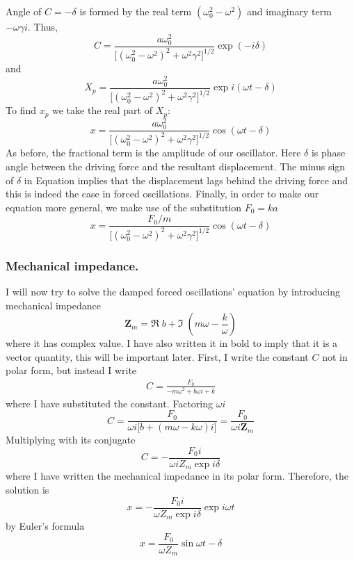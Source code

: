 \documentclass[../../../main.tex]{subfiles}
\begin{document}
Angle of $C=-\delta$ is formed by the real term $(\omega_0^2-\omega^2)$ and imaginary term $-\omega\gamma i$. Thus,
\begin{equation*}
    C=\frac{a\omega_0^2 }{\big[(\omega_0^2- \omega^2)^2 +\omega^2\gamma^2\big]^{1/2} }\exp (-i\delta )
\end{equation*}
and 
\begin{equation*}
    X_p=\frac{a\omega_0^2 }{\big[(\omega_0^2- \omega^2)^2 +\omega^2\gamma^2\big]^{1/2} }\exp i(\omega t-\delta )
\end{equation*}
To find $x_p$ we take the real part of $X_p$:
\begin{equation*}
    x=\frac{a\omega_0^2 }{\big[(\omega_0^2- \omega^2)^2 +\omega^2\gamma^2\big]^{1/2} }\cos (\omega t-\delta )
\end{equation*}
As before, the fractional term is the amplitude of our oscillator. Here $\delta $ is phase angle between the driving force and the resultant displacement. The minus sign of $\delta $ in Equation implies that the displacement lags behind the driving force and this is indeed the case in forced oscillations. Finally, in order to make our equation more general, we make use of the substitution $F_0 = ka$
\begin{equation*}
    x=\frac{F_0/m }{\big[(\omega_0^2- \omega^2)^2 +\omega^2\gamma^2\big]^{1/2} }\cos (\omega t-\delta )
\end{equation*}
\subsubsection{Mechanical impedance.} I will now try to solve the damped forced oscillations' equation by introducing mechanical impedance
\begin{equation*}
    \mathbf{Z}_m= \Re \;b+\Im\; (m\omega- \frac{k}{\omega}) 
\end{equation*}
where it has complex value. I have also written it in bold to imply that it is a vector quantity, this will be important later. First, I write the constant $C$ not in polar form, but instead I write
\begin{align*}
    C=\frac{F_0}{-m\omega^2+b\omega i+k}
\end{align*}
where I have substituted the constant. Factoring $\omega i$
\begin{equation*}
    C=\frac{F_0}{\omega i \big[b+(m\omega-k\omega)i\big]}=\frac{F_0}{\omega i\mathbf{Z}_m}
\end{equation*}
Multiplying with its conjugate
\begin{equation*}
    C=-\frac{F_0i}{\omega i Z_m\exp i\delta}
\end{equation*}
where I have written the mechanical impedance in its polar form. Therefore, the solution is
\begin{equation*}
    x=-\frac{F_0i}{\omega Z_m\exp i\delta}\exp i\omega t
\end{equation*}
by Euler's formula
\begin{equation*}
    x=\frac{F_0 }{\omega Z_m}\sin \omega t-\delta
\end{equation*}
\end{document}
